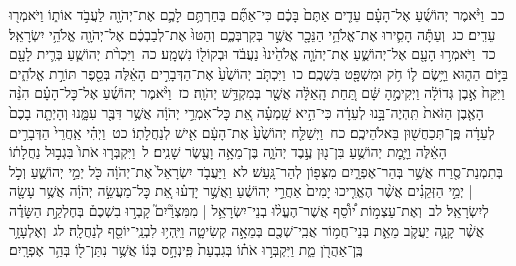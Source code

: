 \documentclass[18pt]{article}
\begin{document}
 {\loc כב~}וַיֹּ֨אמֶר יְהוֹשֻׁ֜עַ אֶל־הָעָ֗ם עֵדִ֤ים אַתֶּם֙ בָּכֶ֔ם כִּי־אַתֶּ֞ם בְּחַרְתֶּ֥ם לָכֶ֛ם אֶת־יְהֹוָ֖ה לַעֲבֹ֣ד אוֹת֑וֹ וַיֹּאמְר֖וּ עֵדִֽים׃ \startlock
 {\loc כג~}וְעַתָּ֕ה הָסִ֛ירוּ אֶת־אֱלֹהֵ֥י הַנֵּכָ֖ר אֲשֶׁ֣ר בְּקִרְבְּכֶ֑ם וְהַטּוּ֙ אֶת־לְבַבְכֶ֔ם אֶל־יְהֹוָ֖ה אֱלֹהֵ֥י יִשְׂרָאֵֽל׃ \startlock
 {\loc כד~}וַיֹּאמְר֥וּ הָעָ֖ם אֶל־יְהוֹשֻׁ֑עַ אֶת־יְהֹוָ֤ה אֱלֹהֵ֙ינוּ֙ נַעֲבֹ֔ד וּבְקוֹל֖וֹ נִשְׁמָֽע׃ \startlock
 {\loc כה~}וַיִּכְרֹ֨ת יְהוֹשֻׁ֧עַ בְּרִ֛ית לָעָ֖ם בַּיּ֣וֹם הַה֑וּא וַיָּ֥שֶׂם ל֛וֹ חֹ֥ק וּמִשְׁפָּ֖ט בִּשְׁכֶֽם׃ \startlock
 {\loc כו~}וַיִּכְתֹּ֤ב יְהוֹשֻׁ֙עַ֙ אֶת־הַדְּבָרִ֣ים הָאֵ֔לֶּה בְּסֵ֖פֶר תּוֹרַ֣ת אֱלֹהִ֑ים וַיִּקַּח֙ אֶ֣בֶן גְּדוֹלָ֔ה וַיְקִימֶ֣הָ שָּׁ֔ם תַּ֚חַת הָֽאַלָּ֔ה אֲשֶׁ֖ר בְּמִקְדַּ֥שׁ יְהֹוָֽה׃ \startlock
 {\loc כז~}וַיֹּ֨אמֶר יְהוֹשֻׁ֜עַ אֶל־כׇּל־הָעָ֗ם הִנֵּ֨ה הָאֶ֤בֶן הַזֹּאת֙ תִּֽהְיֶה־בָּ֣נוּ לְעֵדָ֔ה כִּי־הִ֣יא שָֽׁמְעָ֗ה אֵ֚ת כׇּל־אִמְרֵ֣י יְהֹוָ֔ה אֲשֶׁ֥ר דִּבֶּ֖ר עִמָּ֑נוּ וְהָיְתָ֤ה בָכֶם֙ לְעֵדָ֔ה פֶּֽן־תְּכַחֲשׁ֖וּן בֵּאלֹהֵיכֶֽם׃ \startlock
 {\loc כח~}וַיְשַׁלַּ֤ח יְהוֹשֻׁ֙עַ֙ אֶת־הָעָ֔ם אִ֖ישׁ לְנַחֲלָתֽוֹ׃ \startlock
 {\loc כט~}וַיְהִ֗י אַֽחֲרֵי֙ הַדְּבָרִ֣ים הָאֵ֔לֶּה וַיָּ֛מׇת יְהוֹשֻׁ֥עַ בִּן־נ֖וּן עֶ֣בֶד יְהֹוָ֑ה בֶּן־מֵאָ֥ה וָעֶ֖שֶׂר שָׁנִֽים׃ \startlock
 {\loc ל~}וַיִּקְבְּר֤וּ אֹתוֹ֙ בִּגְב֣וּל נַחֲלָת֔וֹ בְּתִמְנַת־סֶ֖רַח אֲשֶׁ֣ר בְּהַר־אֶפְרָ֑יִם מִצְּפ֖וֹן לְהַר־גָּֽעַשׁ׃ \startlock
 {\loc לא~}וַיַּעֲבֹ֤ד יִשְׂרָאֵל֙ אֶת־יְהֹוָ֔ה כֹּ֖ל יְמֵ֣י יְהוֹשֻׁ֑עַ וְכֹ֣ל  |  יְמֵ֣י הַזְּקֵנִ֗ים אֲשֶׁ֨ר הֶאֱרִ֤יכוּ יָמִים֙ אַחֲרֵ֣י יְהוֹשֻׁ֔עַ וַאֲשֶׁ֣ר יָדְע֗וּ אֵ֚ת כׇּל־מַעֲשֵׂ֣ה יְהֹוָ֔ה אֲשֶׁ֥ר עָשָׂ֖ה לְיִשְׂרָאֵֽל׃ \startlock
 {\loc לב~}וְאֶת־עַצְמ֣וֹת י֠וֹסֵ֠ף אֲשֶׁר־הֶעֱל֨וּ בְנֵי־יִשְׂרָאֵ֥ל  |  מִמִּצְרַ֘יִם֮ קָבְר֣וּ בִשְׁכֶם֒ בְּחֶלְקַ֣ת הַשָּׂדֶ֗ה אֲשֶׁ֨ר קָנָ֧ה יַעֲקֹ֛ב מֵאֵ֛ת בְּנֵי־חֲמ֥וֹר אֲבִֽי־שְׁכֶ֖ם בְּמֵאָ֣ה קְשִׂיטָ֑ה וַיִּֽהְי֥וּ לִבְנֵֽי־יוֹסֵ֖ף לְנַחֲלָֽה׃ \startlock
 {\loc לג~}וְאֶלְעָזָ֥ר בֶּֽן־אַהֲרֹ֖ן מֵ֑ת וַיִּקְבְּר֣וּ אֹת֗וֹ בְּגִבְעַת֙ פִּֽינְחָ֣ס בְּנ֔וֹ אֲשֶׁ֥ר נִתַּן־ל֖וֹ בְּהַ֥ר אֶפְרָֽיִם׃ 
 \pend
\end{document}
